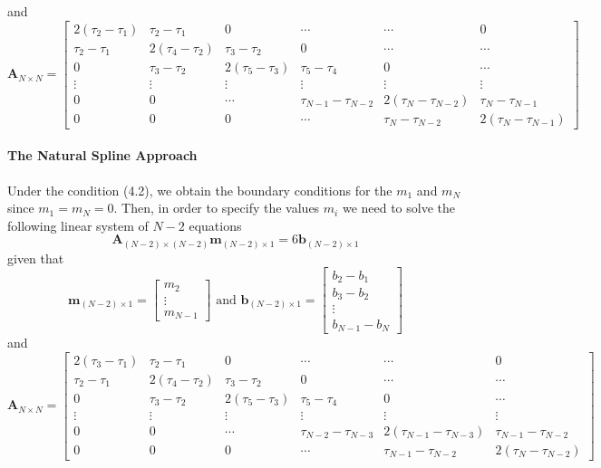 \documentclass[article,moreauthors,pdftex,10pt,a4paper]{ssrn}
\begin{document}
and 
\begin{equation*}
\mathbf{A}_{N \times N} = \begin{bmatrix}
2 (\tau_2 - \tau_1) & \tau_2 - \tau_1 & 0 & \cdots & \cdots & 0\\
\tau_2 - \tau_1 & 2(\tau_4 - \tau_2) & \tau_3 - \tau_2 & 0 & \cdots & \cdots  \\
 0 & \tau_3 - \tau_2 & 2(\tau_5 - \tau_3) & \tau_5 - \tau_4 & 0 &  \cdots \\
 \vdots  & \vdots  & \vdots  & \vdots  & \vdots  &  \vdots   \\
0 &  0 &  \cdots & \tau_{N-1} - \tau_{N-2} & 2(\tau_{N} - \tau_{N-2}) & \tau_{N} - \tau_{N-1}  \\
0 &  0 & 0& \cdots & \tau_{N} - \tau_{N-2} & 2(\tau_N - \tau_{N-1})  
\end{bmatrix}
\end{equation*}

\paragraph{The Natural Spline Approach}
Under the condition (4.2), we obtain the boundary conditions for the $m_1$ and $m_N$ since $m_1 = m_N = 0$. Then, in order to specify the values $m_i$ we need to solve the following linear system of $N-2$ equations
\begin{equation}
\mathbf{A}_{(N-2) \times (N-2)} \mathbf{m}_{(N-2) \times 1} = 6 \mathbf{b}_{(N-2) \times 1}
\end{equation}
given that
\begin{equation*}
\mathbf{m}_{(N-2) \times 1} = \begin{bmatrix}
m_2 \\ \vdots \\ m_{N-1} 
\end{bmatrix} \text{ and }
\mathbf{b}_{(N-2) \times 1} = \begin{bmatrix} 
b_2 - b_1 \\
b_3 - b_2 \\
\vdots \\
b_{N-1} - b_N
\end{bmatrix}
\end{equation*}
and 
\begin{equation*}
\mathbf{A}_{N \times N} = \begin{bmatrix}
2(\tau_3 - \tau_1) & \tau_2 - \tau_1 & 0 & \cdots & \cdots & 0\\
\tau_2 - \tau_1 & 2(\tau_4 - \tau_2) & \tau_3 - \tau_2 & 0 & \cdots & \cdots  \\
 0 & \tau_3 - \tau_2 & 2(\tau_5 - \tau_3) & \tau_5 - \tau_4 & 0 &  \cdots \\
 \vdots  & \vdots  & \vdots  & \vdots  & \vdots  &  \vdots   \\
0 &  0 &  \cdots & \tau_{N-2} - \tau_{N-3} & 2(\tau_{N-1} - \tau_{N-3}) & \tau_{N-1} - \tau_{N-2}  \\
0 &  0 & 0& \cdots & \tau_{N-1} - \tau_{N-2} & 2(\tau_N - \tau_{N-2})  
\end{bmatrix}
\end{equation*}
\end{document}
